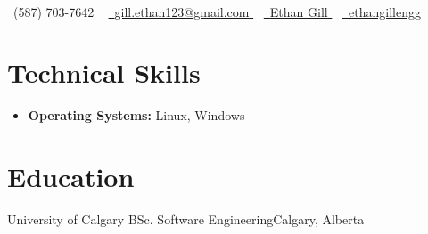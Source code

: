 

\begin{center}
	{\Huge \scshape \color{base07}{Ethan Gill}} \\ \vspace{4pt}
	\small \raisebox{-0.1\height}\faPhone\ (587) 703-7642 ~
	\href{mailto:gill.ethan123@gmail.com}{
		\raisebox{-0.2\height}\faEnvelope\  \underline{gill.ethan123@gmail.com}
	} ~
	\href{https://www.linkedin.com/in/ethan-gill-008a00258/}{
		\raisebox{-0.2\height}\faLinkedin\ \underline{Ethan Gill}
	} ~
	\href{https://github.com/ethangillengg}{
		\raisebox{-0.2\height}\faGithub\ \underline{ethangillengg}
	} 
	\vspace{-4pt}
\end{center}

\section{Technical Skills}
\begin{itemize}[leftmargin=0.15in, label={}, itemsep=1pt]
	\item{\textbf{Operating Systems:} Linux, Windows}
\end{itemize}

\section{Education}
\resumeSubHeadingListStart
\resumeSubheading
{University of Calgary}{}
{BSc. Software Engineering}{Calgary, Alberta}
\resumeItemListStart
{}
\resumeItemListEnd
\resumeSubHeadingListEnd
\vspace{-8pt}


